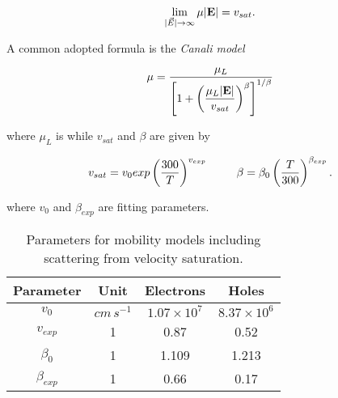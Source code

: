 \begin{equation}
\label{eq: velocity saturation}
\lim_{|\vec{E}| \to \infty} \mu |\mathbf{E}| = v_{sat}.
\end{equation} 

A common adopted formula is the \textit{Canali model} \cite{Canali:Vsat}

\begin{equation}
\label{eq: mobility canali}
\mu = \dfrac{\mu_{L}}{\left[ 1 + \left( \dfrac{\mu_{L}|\mathbf{E}|}{v_{sat}} \right)^{\beta}   \right]^{1/\beta}} 
\end{equation}

where $\mu_L$ is  while $v_{sat}$ and $\beta$ are given by

\begin{equation}
\label{eq: mobility canali beta}
v_{sat} = v_0exp\left( 	\dfrac{300}{T} \right)^{v_{exp}} 
\psp{15}
\beta= \beta_0 \left( \dfrac{T}{300} \right)^{\beta_{exp}}.
\end{equation}

where $v_0$ and $\beta_{exp}$ are fitting parameters.

\begin{table}[!h]
\centering
\begin{tabular}{cccc}
\toprule
Parameter & Unit & Electrons & Holes \\
\midrule
$v_0$ & $cm\,s^{-1}$ & $1.07\times 10^{7}$ & $8.37\times 10^{6}$\\
$v_{exp}$ & 1 & 0.87 & 0.52\\
$\beta_0$ & 1 & 1.109 & 1.213 \\
$\beta_{exp}$ & 1 & 0.66 & 0.17\\
\bottomrule
\end{tabular}
\caption{Parameters for mobility models including scattering from velocity saturation.}
\end{table}

